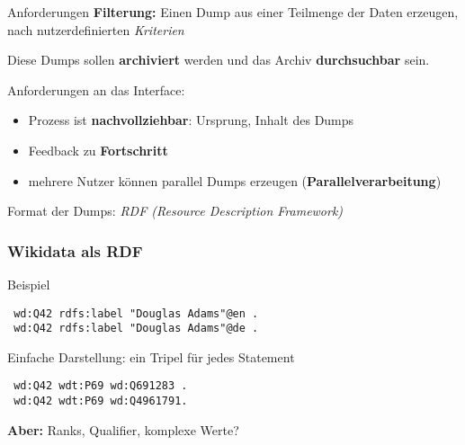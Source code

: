 \documentclass[aspectratio=1609,xcolor=usenames,dvipsnames,svgnames]{beamer}
\begin{document}


\begin{frame}{Anforderungen}
  \alert{\textbf{Filterung:}} Einen Dump aus einer Teilmenge der Daten erzeugen, nach
  nutzerdefinierten \emph{Kriterien}

  Diese Dumps sollen \textbf{archiviert} werden und das Archiv \textbf{durchsuchbar} sein.

  \pause

  Anforderungen an das Interface:
  \begin{itemize}
      \item Prozess ist \textbf{nachvollziehbar}: Ursprung, Inhalt des Dumps
      \item Feedback zu \textbf{Fortschritt}
      \item mehrere Nutzer können parallel Dumps erzeugen (\textbf{Parallelverarbeitung})
  \end{itemize}

  \pause

  Format der Dumps: \emph{RDF (Resource Description Framework)}
\end{frame}

\begin{frame}[t, fragile]\frametitle{Wikidata als RDF}
  \vspace{0.25cm}

  \begin{block}{Beispiel}
  \begin{verbatim}
 wd:Q42 rdfs:label "Douglas Adams"@en .
 wd:Q42 rdfs:label "Douglas Adams"@de .
  \end{verbatim}
  \end{block}

  \begin{block}{Einfache Darstellung: ein Tripel für jedes Statement}
  \begin{verbatim}
 wd:Q42 wdt:P69 wd:Q691283 .
 wd:Q42 wdt:P69 wd:Q4961791.
  \end{verbatim}
  \end{block}

  \textbf{Aber:} Ranks, Qualifier, komplexe Werte? \\
  \vspace{0.5cm}
\end{frame}
\end{document}
